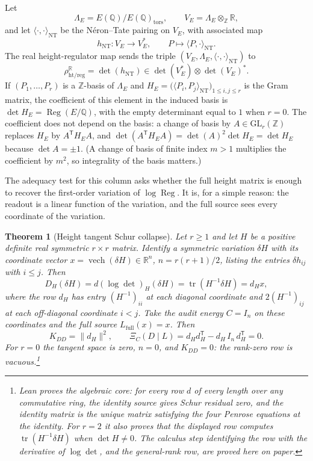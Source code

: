 \documentclass[11pt]{article}
\newtheorem{theorem}{Theorem}[section]
\theoremstyle{definition}
\newcommand{\Q}{\mathbb{Q}}
\newcommand{\R}{\mathbb{R}}
\newcommand{\Z}{\mathbb{Z}}
\newcommand{\Reg}{\operatorname{Reg}}
\newcommand{\tors}{\operatorname{tors}}
\newcommand{\tr}{\operatorname{tr}}
\newcommand{\XiC}{\Xi_C(D\mid L)}        \newcommand{\KDD}{K_{DD}}
\begin{document}
\begin{definition}\label{def:apparatus:height-regulator-map}
Let
\[
  \Lambda_E=E(\Q)/E(\Q)_{\tors},
  \qquad
  V_E=\Lambda_E\otimes_{\Z}\R,
\]
and let $\langle\cdot,\cdot\rangle_{\mathrm{NT}}$ be the N\'eron--Tate
pairing on $V_E$, with associated map
\[
  h_{\mathrm{NT}}:V_E\longrightarrow V_E^*,
  \qquad
  P\longmapsto \langle P,\cdot\rangle_{\mathrm{NT}}.
\]
The real height-regulator map sends the triple
$(V_E,\Lambda_E,\langle\cdot,\cdot\rangle_{\mathrm{NT}})$ to
\[
  \rho_{\mathrm{ht/reg}}^{\R}
  =\det(h_{\mathrm{NT}})\in\det(V_E^*)\otimes\det(V_E)^*.
\]
If $(P_1,\ldots,P_r)$ is a $\Z$-basis of $\Lambda_E$ and
$H_E=\bigl(\langle P_i,P_j\rangle_{\mathrm{NT}}\bigr)_{1\le i,j\le r}$ is
the Gram matrix, the coefficient of this element in the induced basis is
$\det H_E=\Reg(E/\Q)$, with the empty determinant equal to $1$ when $r=0$.
The coefficient does not depend on the basis: a change of basis by
$A\in\mathrm{GL}_r(\Z)$ replaces $H_E$ by $A^{\mathsf T}H_EA$, and
$\det(A^{\mathsf T}H_EA)=\det(A)^2\det H_E=\det H_E$ because
$\det A=\pm1$.  (A change of basis of finite index $m>1$ multiplies the
coefficient by $m^2$, so integrality of the basis matters.)
\end{definition}

The adequacy test for this column asks whether the full height matrix is
enough to recover the first-order variation of $\log\Reg$.  It is, for a
simple reason: the readout is a linear function of the variation, and the
full source sees every coordinate of the variation.

\begin{theorem}[Height tangent Schur collapse]\label{thm:apparatus:height-schur-collapse}
Let $r\ge1$ and let $H$ be a positive definite real symmetric $r\times r$
matrix.  Identify a symmetric variation $\delta H$ with its coordinate
vector $x=\operatorname{vech}(\delta H)\in\R^n$, $n=r(r+1)/2$, listing the
entries $\delta h_{ij}$ with $i\le j$.  Then
\[
  D_H(\delta H)
  =
  d(\log\det)_H(\delta H)
  =
  \tr(H^{-1}\delta H)
  =
  d_Hx,
\]
where the row $d_H$ has entry $(H^{-1})_{ii}$ at each diagonal
coordinate and $2(H^{-1})_{ij}$ at each off-diagonal coordinate $i<j$.
Take the audit energy $C=I_n$ on these coordinates and the full source
$L_{\mathrm{full}}(x)=x$.  Then
\[
  \KDD=\|d_H\|^2,
  \qquad
  \XiC=d_Hd_H^{\mathsf T}-d_H\,I_n\,d_H^{\mathsf T}=0 .
\]
For $r=0$ the tangent space is zero, $n=0$, and $\KDD=0$: the rank-zero
row is vacuous.\footnote{Lean proves the algebraic core: for every row $d$ of every
length over any commutative ring, the identity source gives Schur
residual zero, and the identity matrix is the unique matrix satisfying
the four Penrose equations at the identity.  For $r=2$ it also proves
that the displayed row computes $\tr(H^{-1}\delta H)$ when
$\det H\neq0$.  The calculus step identifying the row with the derivative
of $\log\det$, and the general-rank row, are proved here on paper.}
\end{theorem}
\end{document}
